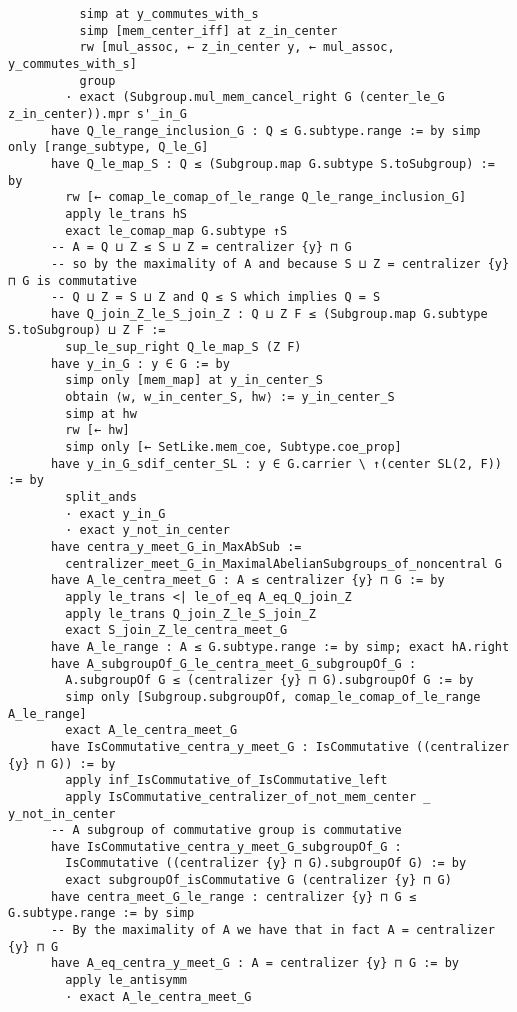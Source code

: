 \begin{tiny}
\begin{verbatim}
          simp at y_commutes_with_s
          simp [mem_center_iff] at z_in_center
          rw [mul_assoc, ← z_in_center y, ← mul_assoc, y_commutes_with_s]
          group
        · exact (Subgroup.mul_mem_cancel_right G (center_le_G z_in_center)).mpr s'_in_G
      have Q_le_range_inclusion_G : Q ≤ G.subtype.range := by simp only [range_subtype, Q_le_G]
      have Q_le_map_S : Q ≤ (Subgroup.map G.subtype S.toSubgroup) := by
        rw [← comap_le_comap_of_le_range Q_le_range_inclusion_G]
        apply le_trans hS
        exact le_comap_map G.subtype ↑S
      -- A = Q ⊔ Z ≤ S ⊔ Z = centralizer {y} ⊓ G
      -- so by the maximality of A and because S ⊔ Z = centralizer {y} ⊓ G is commutative
      -- Q ⊔ Z = S ⊔ Z and Q ≤ S which implies Q = S
      have Q_join_Z_le_S_join_Z : Q ⊔ Z F ≤ (Subgroup.map G.subtype S.toSubgroup) ⊔ Z F :=
        sup_le_sup_right Q_le_map_S (Z F)
      have y_in_G : y ∈ G := by
        simp only [mem_map] at y_in_center_S
        obtain ⟨w, w_in_center_S, hw⟩ := y_in_center_S
        simp at hw
        rw [← hw]
        simp only [← SetLike.mem_coe, Subtype.coe_prop]
      have y_in_G_sdif_center_SL : y ∈ G.carrier \ ↑(center SL(2, F)) := by
        split_ands
        · exact y_in_G
        · exact y_not_in_center
      have centra_y_meet_G_in_MaxAbSub :=
        centralizer_meet_G_in_MaximalAbelianSubgroups_of_noncentral G
      have A_le_centra_meet_G : A ≤ centralizer {y} ⊓ G := by
        apply le_trans <| le_of_eq A_eq_Q_join_Z
        apply le_trans Q_join_Z_le_S_join_Z
        exact S_join_Z_le_centra_meet_G
      have A_le_range : A ≤ G.subtype.range := by simp; exact hA.right
      have A_subgroupOf_G_le_centra_meet_G_subgroupOf_G :
        A.subgroupOf G ≤ (centralizer {y} ⊓ G).subgroupOf G := by
        simp only [Subgroup.subgroupOf, comap_le_comap_of_le_range A_le_range]
        exact A_le_centra_meet_G
      have IsCommutative_centra_y_meet_G : IsCommutative ((centralizer {y} ⊓ G)) := by
        apply inf_IsCommutative_of_IsCommutative_left
        apply IsCommutative_centralizer_of_not_mem_center _ y_not_in_center
      -- A subgroup of commutative group is commutative
      have IsCommutative_centra_y_meet_G_subgroupOf_G :
        IsCommutative ((centralizer {y} ⊓ G).subgroupOf G) := by
        exact subgroupOf_isCommutative G (centralizer {y} ⊓ G)
      have centra_meet_G_le_range : centralizer {y} ⊓ G ≤ G.subtype.range := by simp
      -- By the maximality of A we have that in fact A = centralizer {y} ⊓ G
      have A_eq_centra_y_meet_G : A = centralizer {y} ⊓ G := by
        apply le_antisymm
        · exact A_le_centra_meet_G

\end{verbatim}
\end{tiny}
